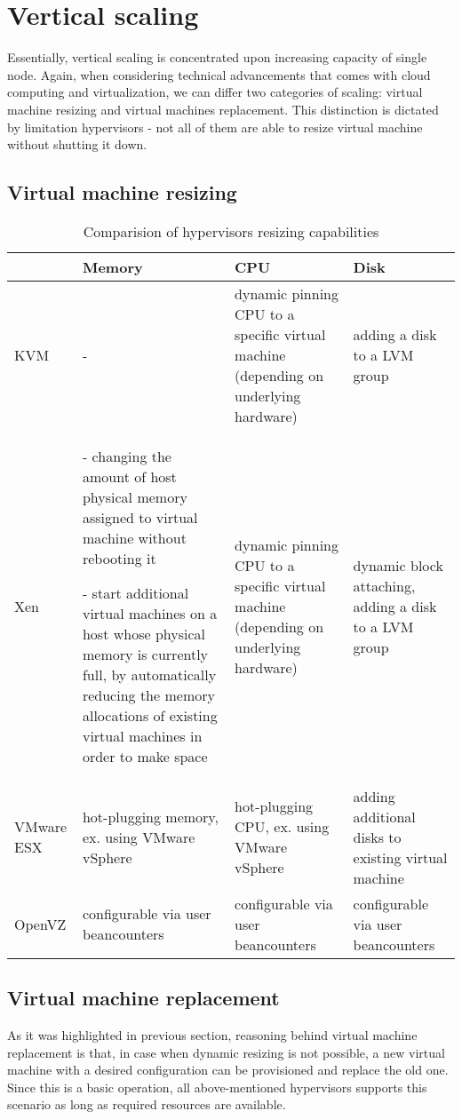 \section{Vertical scaling}
Essentially, vertical scaling is concentrated upon increasing capacity of single node. Again, when considering technical advancements that comes with cloud computing and virtualization, we can differ two categories of scaling: virtual machine resizing and virtual machines replacement. This distinction is dictated by limitation hypervisors - not all of them are able to resize virtual machine without shutting it down.

\subsection*{Virtual machine resizing}


\begin{table}[!htbp]
\begin{tabularx}{\textwidth}{| l | X | X | X |}
\hline
 & \textbf{Memory} & \textbf{CPU} & \textbf{Disk} \\
\hline 
KVM &
-  & 
dynamic pinning CPU to a specific virtual machine (depending on underlying hardware)
& 
adding a disk to a LVM group

\\ \hline
Xen & 
- changing the amount of host physical memory assigned to virtual machine without rebooting it

- start additional virtual machines on a host whose physical memory is currently full, by automatically reducing the memory allocations of existing virtual machines in order to make space
&
dynamic pinning CPU to a specific virtual machine (depending on underlying hardware)
&
dynamic block attaching, adding a disk to a LVM group

\\ \hline
VMware ESX &
hot-plugging memory, ex. using VMware vSphere
&
hot-plugging CPU, ex. using VMware vSphere
&
adding additional disks to existing virtual machine

\\ \hline
OpenVZ &
configurable via user beancounters
&
configurable via user beancounters 
& 
configurable via user beancounters
\\ \hline
\end{tabularx}
\caption{Comparision of hypervisors resizing capabilities}
\label{tab:hypervisors-resizing}
\end{table}


\subsection*{Virtual machine replacement}
As it was highlighted in previous section, reasoning behind virtual machine replacement is that, in case when dynamic resizing is not possible, a new virtual machine with a desired configuration can be provisioned and replace the old one. Since this is a basic operation, all above-mentioned hypervisors supports this scenario as long as required resources are available. 
